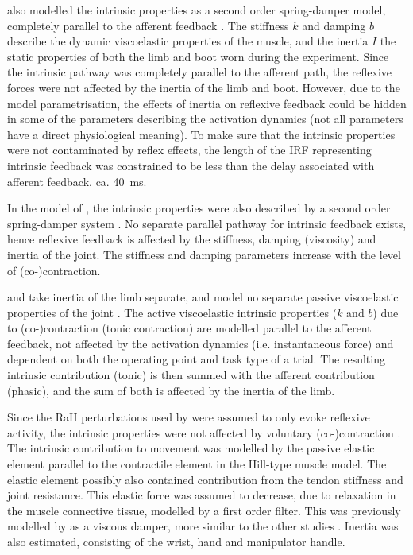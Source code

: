 \citeauthor{mirbagheri_intrinsic_2000} also modelled the intrinsic properties as a second order spring-damper model, completely parallel to the afferent feedback \cite{mirbagheri_intrinsic_2000}. The stiffness $k$ and damping $b$ describe the dynamic viscoelastic properties of the muscle, and the inertia $I$ the static properties of both the limb and boot worn during the experiment. Since the intrinsic pathway was completely parallel to the afferent path, the reflexive forces were not affected by the inertia of the limb and boot. However, due to the model parametrisation, the effects of inertia on reflexive feedback could be hidden in some of the parameters describing the activation dynamics (not all parameters have a direct physiological meaning). To make sure that the intrinsic properties were not contaminated by reflex effects, the length of the IRF representing intrinsic feedback was constrained to be less than the delay associated with afferent feedback, ca. \SI{40}{\milli\second}. 

In the model of \citeauthor{van_der_helm_identification_2002}, the intrinsic properties were also described by a second order spring-damper system \cite{van_der_helm_identification_2002}. No separate parallel pathway for intrinsic feedback exists, hence reflexive feedback is affected by the stiffness, damping (viscosity) and inertia of the joint. The stiffness and damping parameters increase with the level of (co-)contraction. 

\citeauthor{schouten_nmclab_2008} and \citeauthor{mugge_rigorous_2010} take inertia of the limb separate, and model no separate passive viscoelastic properties of the joint \cite{schouten_nmclab_2008, mugge_rigorous_2010}. The active viscoelastic intrinsic properties ($k$ and $b$) due to (co-)contraction (tonic contraction) are modelled parallel to the afferent feedback, not affected by the activation dynamics (i.e. instantaneous force) and dependent on both the operating point and task type of a trial. The resulting intrinsic contribution (tonic) is then summed with the afferent contribution (phasic), and the sum of both is affected by the inertia of the limb.

Since the RaH perturbations used by \citeauthor{de_gooijer-van_de_groep_estimation_2016} were assumed to only evoke reflexive activity, the intrinsic properties were not affected by voluntary (co-)contraction \cite{de_gooijer-van_de_groep_estimation_2016}. The intrinsic contribution to movement was modelled by the passive elastic element parallel to the contractile element in the Hill-type muscle model. The elastic element possibly also contained contribution from the tendon stiffness and joint resistance. This elastic force was assumed to decrease, due to relaxation in the muscle connective tissue, modelled by a first order filter. This was previously modelled by \citeauthor{de_vlugt_relation_2010} as a viscous damper, more similar to the other studies \cite{de_vlugt_relation_2010}. Inertia was also estimated, consisting of the wrist, hand and manipulator handle. 

